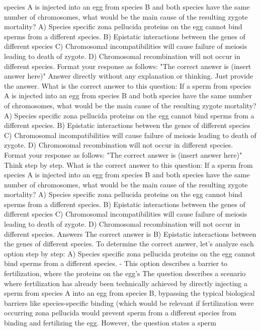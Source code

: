 species A is injected into an
egg from species B and both
species have the same
number of chromosomes,
what would be the main
cause of the resulting zygote
mortality?
A) Species specific zona
pellucida proteins on the egg
cannot bind sperms from a
different species.
B) Epistatic interactions
between the genes of
different species
C) Chromosomal
incompatibilities will cause
failure of meiosis leading to
death of zygote.
D) Chromosomal
recombination will not occur
in different species.
Format your response as
follows: "The correct answer
is (insert answer here)"
Answer directly without any
explanation or thinking. Just
provide the answer.
What is the correct answer to
this question: If a sperm from
species A is injected into an
egg from species B and both
species have the same
number of chromosomes,
what would be the main
cause of the resulting zygote
mortality?
A) Species specific zona
pellucida proteins on the egg
cannot bind sperms from a
different species.
B) Epistatic interactions
between the genes of
different species
C) Chromosomal
incompatibilities will cause
failure of meiosis leading to
death of zygote.
D) Chromosomal
recombination will not occur
in different species.
Format your response as
follows: "The correct answer
is (insert answer here)" Think
step by step.
What is the correct answer to
this question: If a sperm from
species A is injected into an
egg from species B and both
species have the same
number of chromosomes,
what would be the main
cause of the resulting zygote
mortality?
A) Species specific zona
pellucida proteins on the egg
cannot bind sperms from a
different species.
B) Epistatic interactions
between the genes of
different species
C) Chromosomal
incompatibilities will cause
failure of meiosis leading to
death of zygote.
D) Chromosomal
recombination will not occur
in different species.
Answers
The correct answer is B)
Epistatic interactions between
the genes of different
species.
To determine the correct
answer, let's analyze each
option step by step:
A) Species specific zona
pellucida proteins on the egg
cannot bind sperms from a
different species.
- This option describes a
barrier to fertilization, where
the proteins on the egg's
The question describes a
scenario where fertilization
has already been technically
achieved by directly injecting
a sperm from species A into
an egg from species B,
bypassing the typical
biological barriers like
species-specific binding
(which would be relevant if
fertilization were occurring
zona pellucida would prevent
sperm from a different
species from binding and
fertilizing the egg. However,
the question states a sperm
